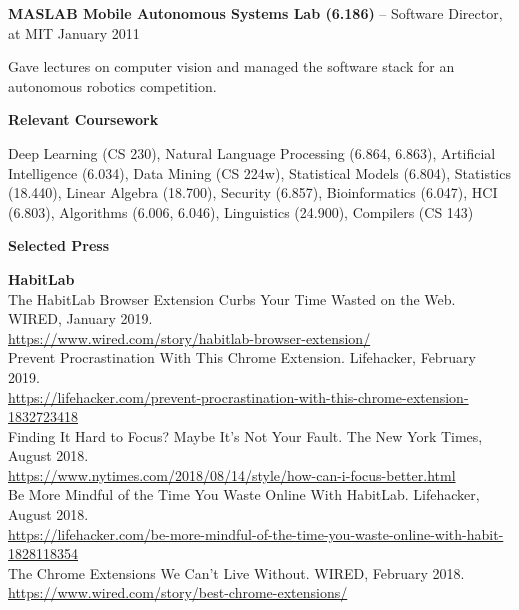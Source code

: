 \documentclass[10pt,A4]{article}
\newcommand{\cvsection}[1]
{
	\begin{center}
		\large\textcolor{sectcol}{\textbf{#1}}
	\end{center}
}
\begin{document}
\textbf{MASLAB Mobile Autonomous Systems Lab (6.186)} -- Software Director, at MIT \hfill \textcolor{sectcol}{January 2011}

Gave lectures on computer vision and managed the software stack for an autonomous robotics competition.\\

\cvsection{Relevant Coursework}

Deep Learning (CS 230), Natural Language Processing (6.864, 6.863), Artificial Intelligence (6.034), Data Mining (CS 224w), Statistical Models (6.804), Statistics (18.440), Linear Algebra (18.700), Security (6.857), Bioinformatics (6.047), HCI (6.803), Algorithms (6.006, 6.046), Linguistics (24.900), Compilers (CS 143)\\

\cvsection{Selected Press}

\textbf{HabitLab}\\

The HabitLab Browser Extension Curbs Your Time Wasted on the Web. WIRED, January 2019.\\
\url{https://www.wired.com/story/habitlab-browser-extension/}\\

Prevent Procrastination With This Chrome Extension. Lifehacker, February 2019.\\
\url{https://lifehacker.com/prevent-procrastination-with-this-chrome-extension-1832723418}\\

Finding It Hard to Focus? Maybe It’s Not Your Fault. The New York Times, August 2018.\\
\url{https://www.nytimes.com/2018/08/14/style/how-can-i-focus-better.html}\\

Be More Mindful of the Time You Waste Online With HabitLab. Lifehacker, August 2018.\\
\url{https://lifehacker.com/be-more-mindful-of-the-time-you-waste-online-with-habit-1828118354}\\

The Chrome Extensions We Can't Live Without. WIRED, February 2018.\\
\url{https://www.wired.com/story/best-chrome-extensions/}\\
\end{document}
